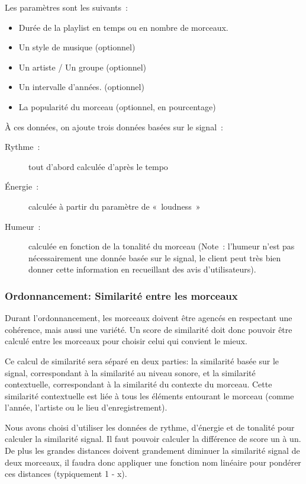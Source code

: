 \documentclass[11pt,a4paper]{article}
\begin{document}
\vspace{3mm}
\noindent Les paramètres sont les suivants~:
\begin{itemize}
\item Durée de la playlist en temps ou en nombre de morceaux.
\item Un style de musique (optionnel)
\item Un artiste / Un groupe (optionnel)
\item Un intervalle d’années. (optionnel)
\item La popularité du morceau (optionnel, en pourcentage)
\end{itemize}

\vspace{3mm}
\noindent À ces données, on ajoute trois données basées sur le signal~:
\begin{description}
\item[Rythme~:] tout d’abord calculée d’après le tempo
\item[Énergie~:] calculée à partir du paramètre de «~loudness~»
\item[Humeur~:] calculée en fonction de la tonalité du morceau (Note~: l’humeur
n’est pas nécessairement une donnée basée sur le signal, le client peut très bien
donner cette information en recueillant des avis d’utilisateurs).
\end{description}

\subsubsection{Ordonnancement: Similarité entre les morceaux}

Durant l'ordonnancement, les morceaux doivent être agencés en respectant une
cohérence, mais aussi une variété. Un score de similarité doit donc pouvoir être
calculé entre les morceaux pour choisir celui qui convient le mieux.

Ce calcul de similarité sera séparé en deux parties: la similarité basée sur le
signal, correspondant à la similarité au niveau sonore, et la similarité
contextuelle, correspondant à la similarité du contexte du morceau. Cette
similarité contextuelle est liée à tous les éléments entourant le morceau (comme
l’année, l’artiste ou le lieu d’enregistrement).

Nous avons choisi d’utiliser les données de rythme, d’énergie et de tonalité pour
calculer la similarité signal. Il faut pouvoir calculer la différence de score un
à un. De plus les grandes distances doivent grandement diminuer la similarité
signal de deux morceaux, il faudra donc appliquer une fonction nom linéaire pour
pondérer ces distances (typiquement 1 - x).
\end{document}
